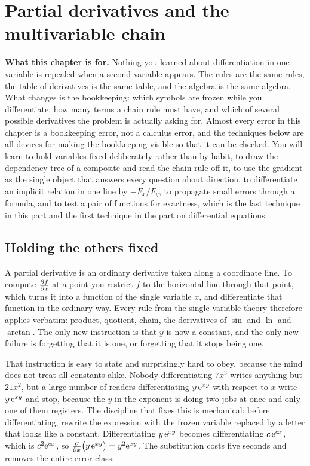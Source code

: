 \chapter{Partial derivatives and the multivariable chain}

\begin{orient}
\textbf{What this chapter is for.} Nothing you learned about differentiation in one variable is repealed when a second variable appears. The rules are the same rules, the table of derivatives is the same table, and the algebra is the same algebra. What changes is the bookkeeping: which symbols are frozen while you differentiate, how many terms a chain rule must have, and which of several possible derivatives the problem is actually asking for. Almost every error in this chapter is a bookkeeping error, not a calculus error, and the techniques below are all devices for making the bookkeeping visible so that it can be checked. You will learn to hold variables fixed deliberately rather than by habit, to draw the dependency tree of a composite and read the chain rule off it, to use the gradient as the single object that answers every question about direction, to differentiate an implicit relation in one line by $-F_{x}/F_{y}$, to propagate small errors through a formula, and to test a pair of functions for exactness, which is the last technique in this part and the first technique in the part on differential equations.
\end{orient}

\section{Holding the others fixed}

A partial derivative is an ordinary derivative taken along a coordinate line. To compute $\frac{\partial f}{\partial x}$ at a point you restrict $f$ to the horizontal line through that point, which turns it into a function of the single variable $x$, and differentiate that function in the ordinary way. Every rule from the single-variable theory therefore applies verbatim: product, quotient, chain, the derivatives of $\sin$ and $\ln$ and $\arctan$. The only new instruction is that $y$ is now a constant, and the only new failure is forgetting that it is one, or forgetting that it stops being one.

That instruction is easy to state and surprisingly hard to obey, because the mind does not treat all constants alike. Nobody differentiating $7x^{3}$ writes anything but $21x^{2}$, but a large number of readers differentiating $y\,\mathrm{e}^{xy}$ with respect to $x$ write $y\,\mathrm{e}^{xy}$ and stop, because the $y$ in the exponent is doing two jobs at once and only one of them registers. The discipline that fixes this is mechanical: before differentiating, rewrite the expression with the frozen variable replaced by a letter that looks like a constant. Differentiating $y\,\mathrm{e}^{xy}$ becomes differentiating $c\,\mathrm{e}^{cx}$, which is $c^{2}\mathrm{e}^{cx}$, so $\frac{\partial }{\partial x}\bigl(y\,\mathrm{e}^{xy}\bigr)=y^{2}\mathrm{e}^{xy}$. The substitution costs five seconds and removes the entire error class.

